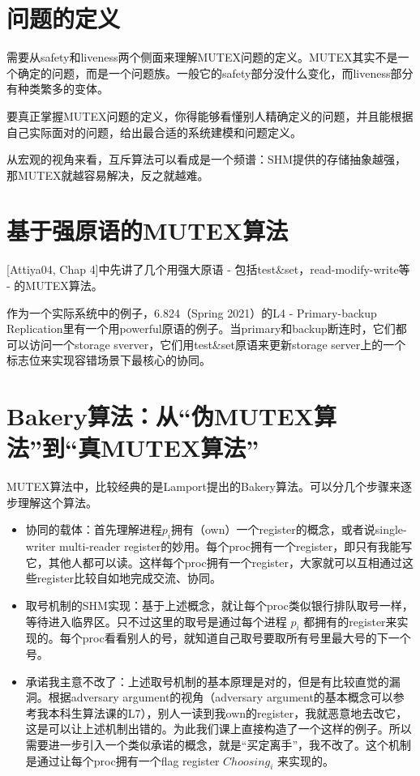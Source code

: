 \documentclass[UTF8]{ctexrep}
\begin{document}
\section{问题的定义}

需要从safety和liveness两个侧面来理解MUTEX问题的定义。MUTEX其实不是一个确定的问题，而是一个问题族。一般它的safety部分没什么变化，而liveness部分有种类繁多的变体。

要真正掌握MUTEX问题的定义，你得能够看懂别人精确定义的问题，并且能根据自己实际面对的问题，给出最合适的系统建模和问题定义。

从宏观的视角来看，互斥算法可以看成是一个频谱：SHM提供的存储抽象越强，那MUTEX就越容易解决，反之就越难。

\section{基于强原语的MUTEX算法}

[Attiya04, Chap 4]中先讲了几个用强大原语 - 包括test\&set，read-modify-write等 - 的MUTEX算法。

作为一个实际系统中的例子，6.824（Spring 2021）的L4 - Primary-backup Replication里有一个用powerful原语的例子。当primary和backup断连时，它们都可以访问一个storage sverver，它们用test\&set原语来更新storage server上的一个标志位来实现容错场景下最核心的协同。

\section{Bakery算法：从“伪MUTEX算法”到“真MUTEX算法”}

MUTEX算法中，比较经典的是Lamport提出的Bakery算法。可以分几个步骤来逐步理解这个算法。

\begin{itemize}
    \item 协同的载体：首先理解进程$p_i$拥有（own）一个register的概念，或者说single-writer multi-reader register的妙用。每个proc拥有一个register，即只有我能写它，其他人都可以读。这样每个proc拥有一个register，大家就可以互相通过这些register比较自如地完成交流、协同。
    
    \item 取号机制的SHM实现：基于上述概念，就让每个proc类似银行排队取号一样，等待进入临界区。只不过这里的取号是通过每个进程 $p_i$ 都拥有的register来实现的。每个proc看看别人的号，就知道自己取号要取所有号里最大号的下一个号。
    
    \item 承诺我主意不改了：上述取号机制的基本原理是对的，但是有比较直觉的漏洞。根据adversary argument的视角（adversary argument的基本概念可以参考我本科生算法课的L7），别人一读到我own的register，我就恶意地去改它，这是可以让上述机制出错的。为此我们课上直接构造了一个这样的例子。所以需要进一步引入一个类似承诺的概念，就是“买定离手”，我不改了。这个机制是通过让每个proc拥有一个flag register $Choosing_i$ 来实现的。
    
\end{itemize}
\end{document}
